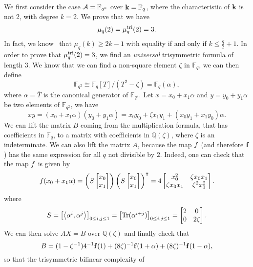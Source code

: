 \documentclass[11pt]{article}
\begin{document}
We first consider the case $\mathcal{A}=\mathbb{F}_{q^k}$ over $\mathbf{k}=\mathbb{F}_q$, where
the characteristic of $\mathbf{k}$ is not $2$, with degree $k=2$. We prove that we have
\[
  \mu_q(2) = \mu_{q}^{\text{tri}}(2) = 3.
\]
In fact, we know~\cite[Theorem 2.2]{BCPRRR19} that $\mu_q(k)\geq2k-1$ with
equality if and only if $k\leq \frac{q}{2}+1$. In order to prove that
$\mu_{q}^{\text{tri}}(2) = 3$, we find an \emph{universal} trisymmetric formula of length
$3$. We know that we can find a non-square element $\zeta$ in $\mathbb{F}_q$, we
can then define
\[
  \mathbb{F}_{q^2}\cong\mathbb{F}_q[T]/(T^2-\zeta)=\mathbb{F}_{q}(\alpha),
\]
where $\alpha=\bar T$ is the canonical generator of $\mathbb{F}_{q^2}$. Let $x =
x_0 + x_1\alpha$ and $y = y_0 + y_1\alpha$ be two elements of
$\mathbb{F}_{q^2}$, we have
\[
  xy = (x_0+x_1\alpha)(y_0+y_1\alpha)=x_0y_0+\zeta x_1y_1
  +(x_0y_1+x_1y_0)\alpha.
\]
We can lift the matrix $B$ coming from
the multiplication formula, that has coefficients in $\mathbb{F}_{q}$, to a
matrix with coefficients in $\mathbb{Q}(\zeta)$, where $\zeta$ is an
indeterminate. We can also lift the matrix $A$, because the map
$f$ (and therefore $\mathbf{f}$) has the same expression for all $q$ not divisible by
$2$.
Indeed, one can check that the map $f$ is given by
\[
  f(x_0+x_1\alpha)=
  \left(S 
  \begin{bmatrix}
    x_0 \\
    x_1
  \end{bmatrix}\right)
  \left(S 
  \begin{bmatrix}
    x_0 \\
    x_1
  \end{bmatrix}\right)^\intercal
  =
  4\begin{bmatrix}
   x_0^2 & \zeta x_0x_1 \\
   \zeta x_0 x_1 & \zeta^2 x_1^2
  \end{bmatrix}.
\]
where
\[
  S =
  \begin{bmatrix}
    \left\langle\alpha^i,\alpha^j\right\rangle
  \end{bmatrix}_{0\leq i, j\leq 1}
  =
  \begin{bmatrix}
    \operatorname{Tr}(\alpha^{i+j})
  \end{bmatrix}_{0\leq i, j\leq 1}
  =
  \begin{bmatrix}
   2 & 0 \\
   0 & 2\zeta
  \end{bmatrix}.
\]
We can then solve $AX=B$ over
$\mathbb{Q}(\zeta)$ and finally check that
\[
  B = (1-\zeta^{-1})4^{-1}\mathbf{f}(1) +
  (8\zeta)^{-1}\mathbf{f}(1+\alpha)+(8\zeta)^{-1}\mathbf{f}(1-\alpha),
\]
so that the trisymmetric bilinear complexity of
\end{document}
